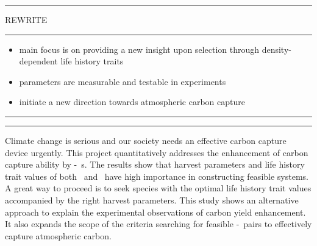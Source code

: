 \documentclass[env.tex]{subfiles}
\begin{document}
\begin{center}\begin{minipage}[H]{.97\linewidth}
\noindent\rule{3.5cm}{1pt}
REWRITE
\noindent\rule{3.5cm}{1pt}
\begin{itemize}
    \item main focus is on providing a new insight upon selection through density-dependent life history traits
    \item parameters are measurable and testable in experiments
    \item initiate a new direction towards atmospheric carbon capture
\end{itemize}\noindent\rule{10cm}{1pt}
\end{minipage}\end{center}

\noindent\rule{10cm}{4pt}

Climate change is serious and our society needs an effective carbon capture device urgently.  This project quantitatively addresses the enhancement of carbon capture ability by \phy-\bac\ \pbs s.  The results show that harvest parameters and life history trait values of both \phy\ and \bac\ have high importance in constructing feasible systems.  A great way to proceed is to seek species with the optimal life history trait values accompanied by the right harvest parameters.  This study shows an alternative approach to explain the experimental observations of carbon yield enhancement.  It also expands the scope of the criteria searching for feasible \phy-\bac\ pairs to effectively capture atmospheric carbon.
\end{document}
